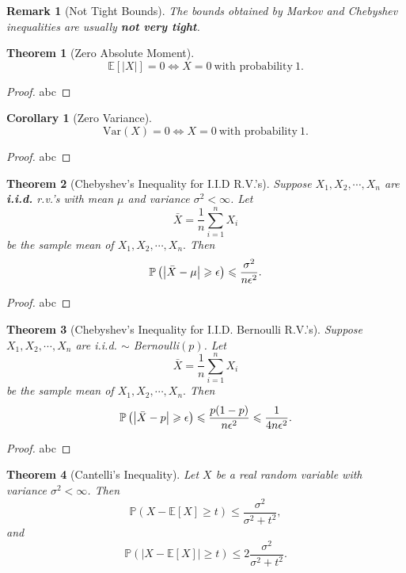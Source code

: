 \documentclass[openany,12pt]{book}
\newtheorem{theorem}{Theorem}[chapter]
\newtheorem{corollary}{Corollary}[chapter]
\newtheorem{remark}{Remark}[chapter]
\begin{document}
\begin{remark}[Not Tight Bounds]
  The bounds obtained by Markov and Chebyshev inequalities are usually \textbf{not very tight}.
\end{remark}

\begin{theorem}[Zero Absolute Moment]
  \begin{equation}
    \mathbb{E}[\left| X \right|] = 0  \Leftrightarrow X = 0 ~\text{with probability}~ 1.
  \end{equation}
\end{theorem}

\begin{proof}
  abc
\end{proof}

\begin{corollary}[Zero Variance]
  \[\mathrm{Var}(X)= 0  \Leftrightarrow X = 0 ~\text{with probability}~ 1.\]
\end{corollary}

\begin{proof}
  abc
\end{proof}

\begin{theorem}[Chebyshev's Inequality for I.I.D R.V.'s]
  Suppose $X_{1}, X_{2}, \cdots,X_{n}$ are \textbf{i.i.d.} r.v.'s with
  mean $\mu$ and variance $\sigma^{2} < \infty$. Let
  \[\bar{X} = \frac{1}{n}\sum_{i = 1}^{n}X_{i}\]
  be the sample mean of $ X_{1}, X_{2}, \cdots,X_{n}.$
  Then
  \[\mathbb{P}\left( \left| \bar{X} - \mu \right| \geqslant \epsilon \right) \leqslant \frac{\sigma^{2}}{n\epsilon^{2}}.\]
\end{theorem}

\begin{proof}
  abc
\end{proof}

\begin{theorem}[Chebyshev's Inequality for I.I.D. Bernoulli R.V.'s]
  Suppose $X_{1}, X_{2}, \cdots,X_{n}$ are i.i.d. $\sim$ Bernoulli$(p)$. Let
  \[\bar{X} = \frac{1}{n}\sum_{i = 1}^{n}X_{i}\]
  be the sample mean of $ X_{1}, X_{2}, \cdots,X_{n}.$
  Then
  \[\mathbb{P}\left( \left| \bar{X} - p \right| \geqslant \epsilon \right) \leqslant \frac{p(1 - p)}{n\epsilon^{2}} \leqslant \frac{1}{4n\epsilon^{2}}.\]
\end{theorem}

\begin{proof}
  abc
\end{proof}

\begin{theorem}[Cantelli’s Inequality]
  Let $X$ be a real random variable with variance $\sigma^2<\infty$. Then
  \begin{equation}
    \mathbb{P}(X-\mathbb{E}[X]\geqslant t)\leqslant\frac{\sigma^2}{\sigma^2+t^2},
  \end{equation}
  and
  \begin{equation}
    \mathbb{P}(|X-\mathbb{E}[X]|\geqslant t)\leqslant2\frac{\sigma^2}{\sigma^2+t^2}.
  \end{equation}
\end{theorem}
\end{document}
